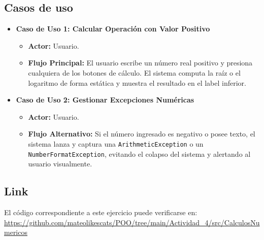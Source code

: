\documentclass[a4paper,11pt]{article}
\begin{document}
\subsection{Casos de uso}
\begin{itemize}
    \item \textbf{Caso de Uso 1: Calcular Operación con Valor Positivo}
    \begin{itemize}
        \item \textbf{Actor:} Usuario.
        \item \textbf{Flujo Principal:} El usuario escribe un número real positivo y presiona cualquiera de los botones de cálculo. El sistema computa la raíz o el logaritmo de forma estática y muestra el resultado en el label inferior.
    \end{itemize}
    \item \textbf{Caso de Uso 2: Gestionar Excepciones Numéricas}
    \begin{itemize}
        \item \textbf{Actor:} Usuario.
        \item \textbf{Flujo Alternativo:} Si el número ingresado es negativo o posee texto, el sistema lanza y captura una \texttt{ArithmeticException} o un \texttt{NumberFormatException}, evitando el colapso del sistema y alertando al usuario visualmente.
    \end{itemize}
\end{itemize}

\subsection{Link}
El código correspondiente a este ejercicio puede verificarse en:
\url{https://github.com/mateolikescats/POO/tree/main/Actividad_4/src/CalculosNumericos}

\newpage

\end{document}
